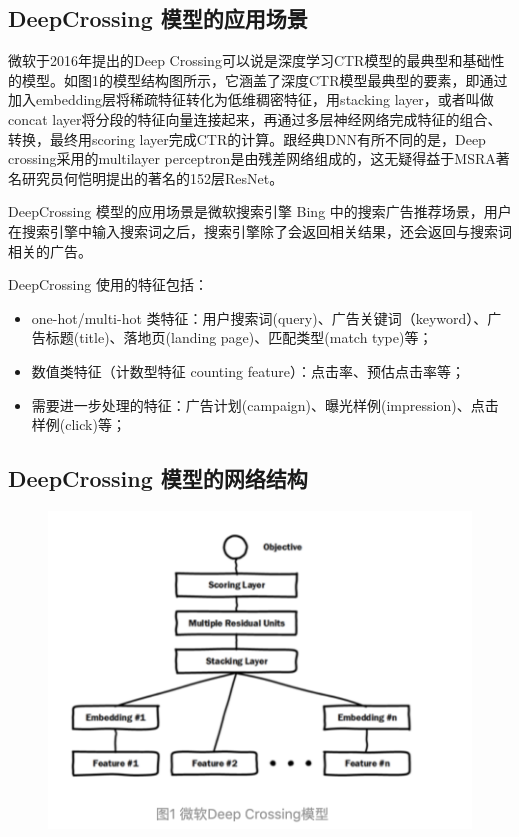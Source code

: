 \documentclass[12pt]{article}
\begin{document}
\subsection{DeepCrossing 模型的应用场景}
微软于2016年提出的Deep Crossing可以说是深度学习CTR模型的最典型和基础性的模型。如图1的模型结构图所示，它涵盖了深度CTR模型最典型的要素，即通过加入embedding层将稀疏特征转化为低维稠密特征，用stacking layer，或者叫做concat layer将分段的特征向量连接起来，再通过多层神经网络完成特征的组合、转换，最终用scoring layer完成CTR的计算。跟经典DNN有所不同的是，Deep crossing采用的multilayer perceptron是由残差网络组成的，这无疑得益于MSRA著名研究员何恺明提出的著名的152层ResNet。

DeepCrossing 模型的应用场景是微软搜索引擎 Bing 中的搜索广告推荐场景，用户在搜索引擎中输入搜索词之后，搜索引擎除了会返回相关结果，还会返回与搜索词相关的广告。

DeepCrossing 使用的特征包括：
\begin{itemize}
\setlength{\itemsep}{0pt}
\setlength{\parsep}{0pt}
\setlength{\parskip}{0pt}
    \item one-hot/multi-hot 类特征：用户搜索词(query)、广告关键词（keyword）、广告标题(title)、落地页(landing page)、匹配类型(match type)等；
    \item 数值类特征（计数型特征 counting feature）：点击率、预估点击率等；
    \item 需要进一步处理的特征：广告计划(campaign)、曝光样例(impression)、点击样例(click)等；
\end{itemize}

\subsection{DeepCrossing 模型的网络结构}
\begin{figure}[H]
    \centering
    \includegraphics[width=.6\textwidth]{fig/Microsoft_Deep_Crossing_Strucure.png}
\end{figure}
\end{document}
